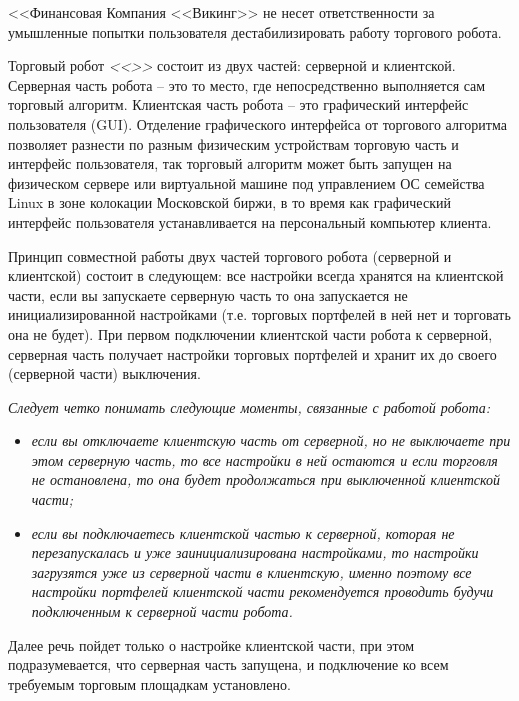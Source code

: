 
<<Финансовая Компания <<Викинг>> не несет ответственности за умышленные попытки пользователя дестабилизировать работу торгового робота.


Торговый робот \emph{<<\AppName>>} состоит из двух частей: серверной и клиентской. Серверная часть робота -- это то место, где непосредственно выполняется сам торговый
алгоритм.  Клиентская часть робота  -- это графический интерфейс пользователя (GUI). Отделение графического интерфейса от торгового алгоритма позволяет разнести по разным
физическим устройствам торговую часть и интерфейс пользователя, так торговый алгоритм может быть запущен на физическом сервере или виртуальной машине под управлением ОС
семейства Linux в зоне колокации Московской биржи, в то время как графический интерфейс пользователя устанавливается на персональный компьютер клиента.

Принцип совместной работы двух частей торгового робота (серверной и клиентской) состоит в следующем: все настройки всегда хранятся на клиентской части, если вы запускаете
серверную часть то она запускается не инициализированной настройками (т.е. торговых портфелей в ней нет и торговать она не будет). При первом подключении клиентской части
робота к серверной, серверная часть получает настройки торговых портфелей и хранит их до своего (серверной части) выключения.

\emph{Следует четко понимать следующие моменты, связанные с работой робота:}
\vspace{-\topsep}
\begin{itemize}
\setlength{\parskip}{0pt}
\setlength{\itemsep}{0pt plus 1pt}
\item \emph{если вы отключаете клиентскую часть от серверной, но не выключаете при этом серверную часть, то все настройки в ней остаются и если торговля не остановлена, то она
	будет продолжаться при выключенной клиентской части;}
\item \emph{если вы подключаетесь клиентской частью к серверной, которая не перезапускалась и уже заинициализирована настройками, то настройки загрузятся уже из серверной
	части в клиентскую, именно поэтому все настройки портфелей клиентской части рекомендуется проводить будучи подключенным к серверной части робота.}
\end{itemize}
\vspace{-\topsep}

Далее речь пойдет только о настройке клиентской части, при этом подразумевается, что серверная часть запущена, и подключение ко всем требуемым торговым площадкам установлено.\newline

